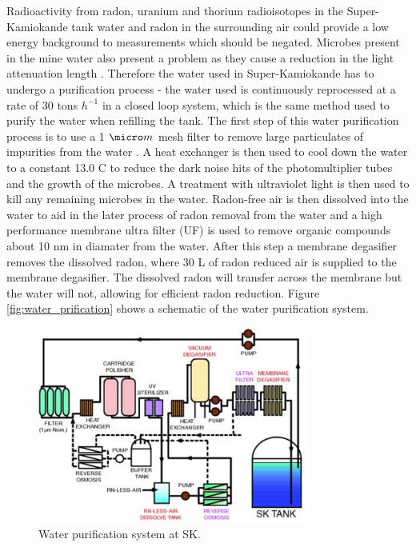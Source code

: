 Radioactivity from radon, uranium and thorium radioisotopes in the Super-Kamiokande tank water and radon in the surrounding air could provide a low energy background to measurements which should be negated. Microbes present in the mine water also present a problem as they cause a reduction in the light attenuation length \cite{nakano2020measurement}. Therefore the water used in Super-Kamiokande has to undergo a purification process - the water used is continuously reprocessed at a rate of 30 tons $h^{-1}$ in a closed loop system, which is the same method used to purify the water when refilling the tank. The first step of this water purification process is to use a 1 $\micro m$ mesh filter to remove large particulates of impurities from the water \cite{fernandez_status_2016}. A heat exchanger is then used to cool down the water to a constant 13.0 \degree C to reduce the dark noise hits of the photomultiplier tubes and the growth of the microbes. A treatment with ultraviolet light is then used to kill any remaining microbes in the water. Radon-free air is then dissolved into the water to aid in the later process of radon removal from the water and a high performance membrane ultra filter (UF) is used to remove organic compounds about 10 nm in diamater from the water. After this step a membrane degasifier removes the dissolved radon, where 30 L of radon reduced air is supplied to the membrane degasifier. The dissolved radon will transfer across the membrane but the water will not, allowing for efficient radon reduction. Figure \ref{fig:water_prification} shows a schematic of the water purification system. 
\newline 


\begin{figure}
    \centering
    \includegraphics[width=0.8\textwidth]{Figures/water_purification.png}
\caption{Water purification system at SK.}
    \label{fig:PMTdiagram}
\end{figure}



